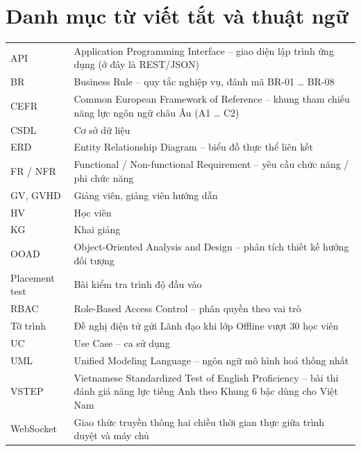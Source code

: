 \chapter*{Danh mục từ viết tắt và thuật ngữ}

\begin{xltabular}{\linewidth}{|L{3.2cm}|Y|}
  \hline
  \headrow {} &  \\ \hline
  \endhead
  API & Application Programming Interface – giao diện lập trình ứng dụng (ở đây là REST/JSON) \\ \hline
  BR & Business Rule – quy tắc nghiệp vụ, đánh mã BR-01 … BR-08 \\ \hline
  CEFR & Common European Framework of Reference – khung tham chiếu năng lực ngôn ngữ châu Âu (A1 … C2) \\ \hline
  CSDL & Cơ sở dữ liệu \\ \hline
  ERD & Entity Relationship Diagram – biểu đồ thực thể liên kết \\ \hline
  FR / NFR & Functional / Non-functional Requirement – yêu cầu chức năng / phi chức năng \\ \hline
  GV, GVHD & Giảng viên, giảng viên hướng dẫn \\ \hline
  HV & Học viên \\ \hline
  KG & Khai giảng \\ \hline
  OOAD & Object-Oriented Analysis and Design – phân tích thiết kế hướng đối tượng \\ \hline
  Placement test & Bài kiểm tra trình độ đầu vào \\ \hline
  RBAC & Role-Based Access Control – phân quyền theo vai trò \\ \hline
  Tờ trình & Đề nghị điện tử gửi Lãnh đạo khi lớp Offline vượt 30 học viên \\ \hline
  UC & Use Case – ca sử dụng \\ \hline
  UML & Unified Modeling Language – ngôn ngữ mô hình hoá thống nhất \\ \hline
  VSTEP & Vietnamese Standardized Test of English Proficiency – bài thi đánh giá năng lực tiếng Anh theo Khung 6 bậc dùng cho Việt Nam \\ \hline
  WebSocket & Giao thức truyền thông hai chiều thời gian thực giữa trình duyệt và máy chủ \\ \hline
\end{xltabular}

